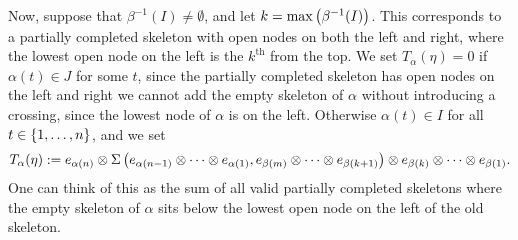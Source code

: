 Now, suppose that $\beta^{-1}(I) \neq \emptyset$, and let $k = \max\left(\beta^{-1}(I)\right)$.
This corresponds to a partially completed skeleton with open nodes on both the left and right, where the lowest open node on the left is the $k^\mathrm{th}$ from the top.
We set $T_{\alpha}(\eta) = 0$ if $\alpha(t) \in J$ for some $t$, since the partially completed skeleton has open nodes on the left and right we cannot add the empty skeleton of $\alpha$ without introducing a crossing, since the lowest node of $\alpha$ is on the left.
Otherwise $\alpha(t) \in I$ for all $t \in \left\{1,\ldots, n\right\}$, and we set
\[T_{\alpha}(\eta) := e_{\alpha(n)}\otimes \Sigma\left( e_{\alpha(n-1)} \otimes \cdots \otimes e_{\alpha(1)}, e_{\beta(m)} \otimes \cdots \otimes e_{\beta(k+1)} \right) \otimes e_{\beta(k)} \otimes \cdots \otimes e_{\beta(1)}.
\]
One can think of this as the sum of all valid partially completed skeletons where the empty skeleton of $\alpha$ sits below the lowest open node on the left of the old skeleton.

